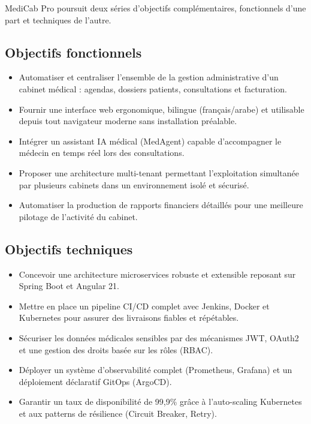 MediCab Pro poursuit deux séries d'objectifs complémentaires, fonctionnels
d'une part et techniques de l'autre.

\subsection{Objectifs fonctionnels}

\begin{itemize}
  \item Automatiser et centraliser l'ensemble de la gestion administrative
    d'un cabinet médical : agendas, dossiers patients, consultations et facturation.
  \item Fournir une interface web ergonomique, bilingue (français/arabe) et
    utilisable depuis tout navigateur moderne sans installation préalable.
  \item Intégrer un assistant IA médical (MedAgent) capable d'accompagner
    le médecin en temps réel lors des consultations.
  \item Proposer une architecture multi-tenant permettant l'exploitation simultanée
    par plusieurs cabinets dans un environnement isolé et sécurisé.
  \item Automatiser la production de rapports financiers détaillés pour une
    meilleure pilotage de l'activité du cabinet.
\end{itemize}

\subsection{Objectifs techniques}

\begin{itemize}
  \item Concevoir une architecture microservices robuste et extensible reposant
    sur Spring Boot et Angular 21.
  \item Mettre en place un pipeline CI/CD complet avec Jenkins, Docker et Kubernetes
    pour assurer des livraisons fiables et répétables.
  \item Sécuriser les données médicales sensibles par des mécanismes JWT, OAuth2
    et une gestion des droits basée sur les rôles (RBAC).
  \item Déployer un système d'observabilité complet (Prometheus, Grafana) et
    un déploiement déclaratif GitOps (ArgoCD).
  \item Garantir un taux de disponibilité de 99,9\% grâce à l'auto-scaling
    Kubernetes et aux patterns de résilience (Circuit Breaker, Retry).
\end{itemize}

